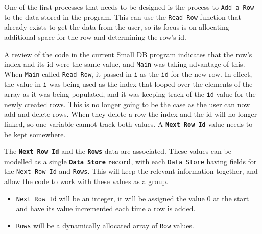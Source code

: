 One of the first processes that needs to be designed is the process to \texttt{Add a Row} to the data stored in the program. This can use the \texttt{Read Row} function that already exists to get the data from the user, so its focus is on allocating additional space for the row and determining the row's id.

A review of the code in the current Small DB program indicates that the row's index and its id were the same value, and \texttt{Main} was taking advantage of this. When \texttt{Main} called \texttt{Read Row}, it passed in \texttt{i} as the \texttt{id} for the new row. In effect, the value in \texttt{i} was being used as the index that looped over the elements of the array as it was being populated, and it was keeping track of the \texttt{id} value for the newly created rows. This is no longer going to be the case as the user can now add and delete rows. When they delete a row the index and the id will no longer linked, so one variable cannot track both values. A \texttt{\textbf{Next Row Id}} value needs to be kept somewhere.

The \texttt{\textbf{Next Row Id}} and the \textbf{\texttt{Rows}} data are associated. These values can be modelled as a single \texttt{\textbf{Data Store}} \textbf{record}, with each \texttt{Data Store} having fields for the \texttt{Next Row Id} and \texttt{Rows}. This will keep the relevant information together, and allow the code to work with these values as a group.

\begin{itemize}
  \item \texttt{Next Row Id} will be an integer, it will be assigned the value 0 at the start and have its value incremented each time a row is added. 
  \item \texttt{Rows} will be a dynamically allocated array of \texttt{Row} values.
\end{itemize}




